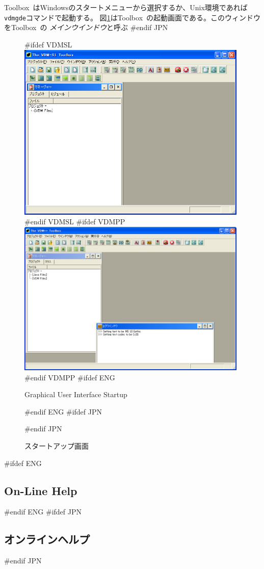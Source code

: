 \documentclass[\pformat,12pt]{article}
\newcommand{\Toolbox}{Toolbox}
\newcommand{\vdmgde}{vdmgde}
\newcommand{\Toolbox}{Toolbox}
\newcommand{\vdmgde}{vppgde}
\begin{document}
\Toolbox\ はWindowsのスタートメニューから選択するか、Unix環境であれば{\tt
  \vdmgde}コマンドで起動する。
図\ref{fig:startgui}は\Toolbox\ の起動画面である。このウィンドウを\Toolbox\ の
{\em メインウインドウ\/}と呼ぶ
#endif JPN

\begin{figure}[tbh]
\begin{center}
#ifdef VDMSL
\includegraphics[width=11cm]{startgui-sl.png}
#endif VDMSL
#ifdef VDMPP
\includegraphics[width=11cm]{startgui-pp.png}
#endif VDMPP
#ifdef ENG
\caption{Graphical User Interface Startup}
#endif ENG
#ifdef JPN
\caption{スタートアップ画面}
#endif JPN
\label{fig:startgui}
\end{center}
\end{figure}

#ifdef ENG
\subsection{On-Line Help}
#endif ENG
#ifdef JPN
\subsection{オンラインヘルプ}
#endif JPN
 
\end{document}
